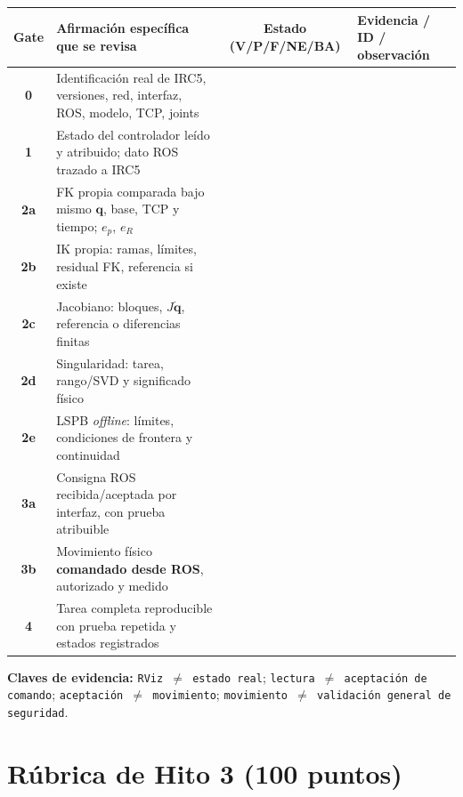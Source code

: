 \documentclass[10pt, a4paper]{article}
\begin{document}
\begingroup
\scriptsize
\setlength{\tabcolsep}{3.5pt}
\renewcommand{\arraystretch}{1.45}
\noindent\begin{tabularx}{\textwidth}{|c|>{\hsize=1.20\hsize\raggedright\arraybackslash}X|c|>{\hsize=0.80\hsize\raggedright\arraybackslash}X|}
\hline
\rowcolor{ucbblue!15}
\textbf{Gate} & \textbf{Afirmación específica que se revisa} & \textbf{Estado (V/P/F/NE/BA)} & \textbf{Evidencia / ID / observación} \\ \hline
\textbf{0} & Identificación real de IRC5, versiones, red, interfaz, ROS, modelo, TCP, joints & & \\ \hline
\textbf{1} & Estado del controlador leído y atribuido; dato ROS trazado a IRC5 & & \\ \hline
\textbf{2a} & FK propia comparada bajo mismo $\mathbf{q}$, base, TCP y tiempo; $e_p$, $e_R$ & & \\ \hline
\textbf{2b} & IK propia: ramas, límites, residual FK, referencia si existe & & \\ \hline
\textbf{2c} & Jacobiano: bloques, $J\dot{\mathbf{q}}$, referencia o diferencias finitas & & \\ \hline
\textbf{2d} & Singularidad: tarea, rango/SVD y significado físico & & \\ \hline
\textbf{2e} & LSPB \textit{offline}: límites, condiciones de frontera y continuidad & & \\ \hline
\textbf{3a} & Consigna ROS recibida/aceptada por interfaz, con prueba atribuible & & \\ \hline
\textbf{3b} & Movimiento físico \textbf{comandado desde ROS}, autorizado y medido & & \\ \hline
\textbf{4} & Tarea completa reproducible con prueba repetida y estados registrados & & \\ \hline
\end{tabularx}
\endgroup

\vspace{2pt}
{\footnotesize\textbf{Claves de evidencia:} \texttt{RViz $\neq$ estado real}; \texttt{lectura $\neq$ aceptación de comando}; \texttt{aceptación $\neq$ movimiento}; \texttt{movimiento $\neq$ validación general de seguridad}.}

\newpage
\section{Rúbrica de Hito 3 (100 puntos)}
\end{document}
